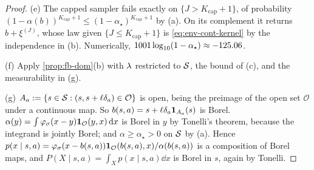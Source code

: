 \begin{proof}
(e) The capped sampler fails exactly on $\{J>K_{\mathrm{cap}}+1\}$, of probability $(1-\alpha(b))^{K_{\mathrm{cap}}+1}\le(1-\alpha_\star)^{K_{\mathrm{cap}}+1}$ by (a). On its complement it returns $b+\xi^{(J)}$, whose law given $\{J\le K_{\mathrm{cap}}+1\}$ is \eqref{eq:env-cont-kernel} by the independence in (b).
Numerically, $\vn{env.cap}{1001}\log_{10}(1-\alpha_\star)\approx\vn{const.cap_log10}{-125.06}$.

(f) Apply \cref{prop:fb-dom}(b) with $\Leb$ restricted to $\cS$, the bound of (c), and the measurability in (g).

(g) $A_a:=\{s\in\cS:(s,s+\ell\delta_a)\in\mathcal O\}$ is open, being the preimage of the open set $\mathcal O$ under a continuous map. So $b(s,a)=s+\ell\delta_a\ind_{A_a}(s)$ is Borel.
$\alpha(y)=\int\varphi_\sigma(x-y)\ind_{\mathcal O}(y,x)\dd x$ is Borel in $y$ by Tonelli's theorem, because the integrand is jointly Borel; and $\alpha\ge\alpha_\star>0$ on $\cS$ by (a).
Hence $p(x\mid s,a)=\varphi_\sigma(x-b(s,a))\ind_{\mathcal O}(b(s,a),x)/\alpha(b(s,a))$ is a composition of Borel maps, and $P(X\mid s,a)=\int_Xp(x\mid s,a)\dd x$ is Borel in $s$, again by Tonelli.
\end{proof}

